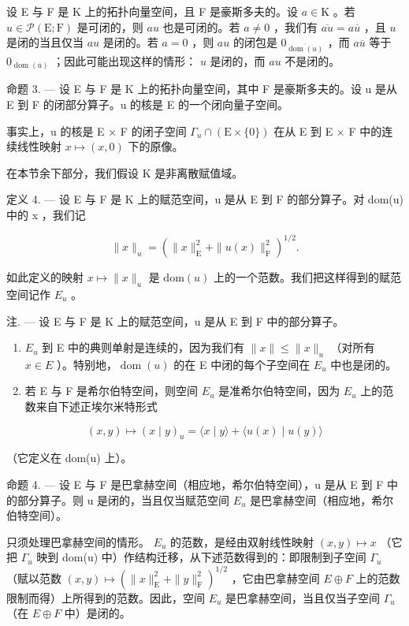 设 E 与 F 是 K 上的拓扑向量空间，且 F 是豪斯多夫的。设 \(a \in \mathrm{K}\) 。若 \(u \in \mathcal{P}(\mathrm{E};\mathrm{F})\) 是可闭的，则 \(au\) 也是可闭的。若 \(a \neq 0\) ，我们有 \(\overline{au} = a\overline{u}\) ，且 \(u\) 是闭的当且仅当 \(au\) 是闭的。若 \(a = 0\) ，则 \(au\) 的闭包是 \(0_{\overline{\operatorname{dom}(u)}}\) ，而 \(a\overline{u}\) 等于 \(0_{\operatorname{dom}(\overline{u})}\) ；因此可能出现这样的情形： \(u\) 是闭的，而 \(au\) 不是闭的。

命题 3. --- 设 E 与 F 是 K 上的拓扑向量空间，其中 F 是豪斯多夫的。设 u 是从 E 到 F 的闭部分算子。u 的核是 E 的一个闭向量子空间。

事实上，u 的核是 E × F 的闭子空间 \(\Gamma_{u} \cap (\mathrm{E} \times \{0\})\) 在从 E 到 E × F 中的连续线性映射 \(x \mapsto (x, 0)\) 下的原像。

在本节余下部分，我们假设 K 是非离散赋值域。

定义 4. --- 设 E 与 F 是 K 上的赋范空间，u 是从 E 到 F 的部分算子。对 dom(u) 中的 x ，我们记

\[
\| x \| _ {u} = (\| x \| _ {\mathrm{E}} ^ {2} + \| u (x) \| _ {\mathrm{F}} ^ {2}) ^ {1 / 2}.
\]

如此定义的映射 \(x \mapsto \|x\|_{u}\) 是 \(\text{dom}(u)\) 上的一个范数。我们把这样得到的赋范空间记作 \(E_{u}\) 。

注. --- 设 E 与 F 是 K 上的赋范空间，u 是从 E 到 F 中的部分算子。

\begin{enumerate}
\def\labelenumi{\arabic{enumi})}
\item
  \(E_{u}\) 到 E 中的典则单射是连续的，因为我们有 \(\|x\|\leqslant\|x\|_{u}\) （对所有 \(x\in E\) ）。特别地，\(\operatorname{dom}(u)\) 的在 E 中闭的每个子空间在 \(E_{u}\) 中也是闭的。
\item
  若 E 与 F 是希尔伯特空间，则空间 \(E_{u}\) 是准希尔伯特空间，因为 \(E_{u}\) 上的范数来自下述正埃尔米特形式
\end{enumerate}

\[
(x, y) \mapsto (x \mid y) _ {u} = \langle x \mid y \rangle + \langle u (x) \mid u (y) \rangle
\]

（它定义在 dom(u) 上）。

命题 4. --- 设 E 与 F 是巴拿赫空间（相应地，希尔伯特空间），u 是从 E 到 F 中的部分算子。则 u 是闭的，当且仅当赋范空间 \(E_{u}\) 是巴拿赫空间（相应地，希尔伯特空间）。

只须处理巴拿赫空间的情形。 \(E_{u}\) 的范数，是经由双射线性映射 \((x,y)\mapsto x\) （它把 \(\Gamma_{u}\) 映到 dom(u) 中）作结构迁移，从下述范数得到的：即限制到子空间 \(\Gamma_{u}\) （赋以范数 \((x,y)\mapsto(\|x\|_{\mathrm{E}}^{2}+\|y\|_{\mathrm{F}}^{2})^{1/2}\) ，它由巴拿赫空间 \(E\oplus F\) 上的范数限制而得）上所得到的范数。因此，空间 \(E_{u}\) 是巴拿赫空间，当且仅当子空间 \(\Gamma_{u}\) （在 \(E\oplus F\) 中）是闭的。

